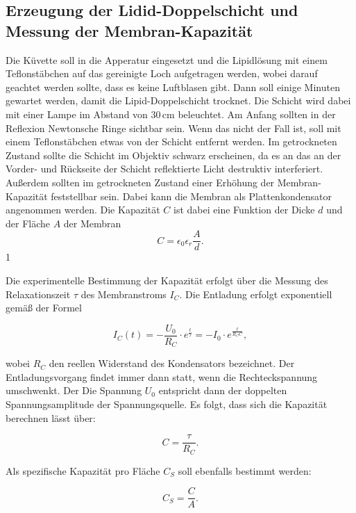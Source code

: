 \documentclass[a4paper,ngerman]{scrartcl}
\begin{document}
\subsection{Erzeugung der Lidid-Doppelschicht und Messung der Membran-Kapazität}
\label{sec:capacity}
Die Küvette soll in die Apperatur eingesetzt und die Lipidlösung mit einem Teflonstäbchen auf das gereinigte Loch aufgetragen werden, wobei darauf geachtet werden sollte, dass es keine Luftblasen gibt.
Dann soll einige Minuten gewartet werden, damit die Lipid-Doppelschicht trocknet. Die Schicht wird dabei mit einer Lampe im Abstand
von 30\,cm beleuchtet. Am Anfang sollten in der Reflexion Newtonsche Ringe sichtbar sein. Wenn das nicht der Fall ist, soll mit einem
Teflonstäbchen etwas von der Schicht entfernt werden. Im getrockneten Zustand sollte die Schicht im Objektiv schwarz erscheinen, da es 
an das an der Vorder- und Rückseite der Schicht reflektierte Licht destruktiv interferiert. Außerdem sollten im getrockneten Zustand 
einer Erhöhung der Membran-Kapazität feststellbar sein. Dabei kann die Membran als Plattenkondensator angenommen werden. Die Kapazität $C$
ist dabei eine Funktion der Dicke $d$ und der Fläche $A$ der Membran
\begin{equation}
C = \epsilon_0 \epsilon_r \frac{A}{d}.
\end{equation}1

Die experimentelle Bestimmung der Kapazität erfolgt über die Messung des Relaxationszeit $\tau$ des Membranstroms $I_C$. Die Entladung erfolgt
exponentiell gemäß der Formel

\begin{equation}
  I_C(t) = - \frac{U_0}{R_C} \cdot e^{\frac{t}{\tau}} = - I_0 \cdot e^{\frac{t}{R_C C}},
\end{equation}

wobei $R_C$ den reellen Widerstand des Kondensators bezeichnet. Der Entladungsvorgang findet immer dann statt, wenn die Rechteckspannung umschwenkt. Der Die Spannung $U_0$ entspricht dann der doppelten Spannungsamplitude der Spannungsquelle.
Es folgt, dass sich die Kapazität berechnen lässt über:

\begin{equation}
  C = \frac{\tau}{R_C}.
\end{equation}

Als spezifische Kapazität pro Fläche $C_S$ soll ebenfalls bestimmt werden:

\begin{equation}
  C_S = \frac{C}{A}.
\end{equation}
\end{document}
